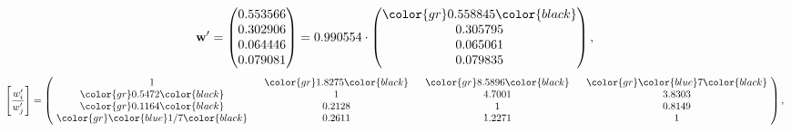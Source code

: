 \begin{example}
\begin{equation*}
\mathbf{w}^{\prime} =
\begin{pmatrix}
0.553566\\
0.302906\\
0.064446\\
0.079081
\end{pmatrix} =
0.990554\cdot
\begin{pmatrix}
\color{gr} 0.558845\color{black} \\
0.305795\\
0.065061\\
0.079835
\end{pmatrix},
\end{equation*}
\begin{equation*}
\left[ \frac{{w}^{\prime}_i}{{w}^{\prime}_j} \right] =
\begin{pmatrix}
$\,\,$ 1 $\,\,$ & $\,\,$\color{gr} 1.8275\color{black} $\,\,$ & $\,\,$\color{gr} 8.5896\color{black} $\,\,$ & $\,\,$\color{gr} \color{blue} 7\color{black} $\,\,$ \\
$\,\,$\color{gr} 0.5472\color{black} $\,\,$ & $\,\,$ 1 $\,\,$ & $\,\,$4.7001$\,\,$ & $\,\,$3.8303  $\,\,$ \\
$\,\,$\color{gr} 0.1164\color{black} $\,\,$ & $\,\,$0.2128$\,\,$ & $\,\,$ 1 $\,\,$ & $\,\,$0.8149 $\,\,$ \\
$\,\,$\color{gr} \color{blue}  1/7\color{black} $\,\,$ & $\,\,$0.2611$\,\,$ & $\,\,$1.2271$\,\,$ & $\,\,$ 1  $\,\,$ \\
\end{pmatrix},
\end{equation*}
\end{example}
\newpage

